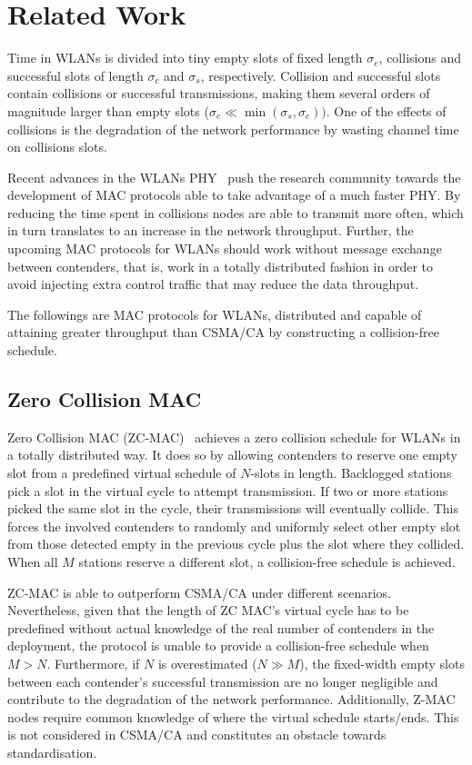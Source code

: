 \documentclass[a4paper,journal]{IEEEtran}
\begin{document}
\section{Related Work}\label{relatedWork}
Time in WLANs is divided into tiny empty slots of fixed length $\sigma_{e}$, collisions and successful slots of length $\sigma_{c}$ and $\sigma_{s}$, respectively. Collision and successful slots contain collisions or successful transmissions, making them several orders of magnitude larger than empty slots ($\sigma_{e}\ll\min(\sigma_{s},\sigma_{c}))$. One of the effects of collisions is the degradation of the network performance by wasting channel time on collisions slots. 

Recent advances in the WLANs PHY~\cite{perahia2008ieee,6191306} push the research community towards the development of MAC protocols able to take advantage of a much faster PHY. By reducing the time spent in collisions nodes are able to transmit more often, which in turn translates to an increase in the network throughput. Further, the upcoming MAC protocols for WLANs should work without message exchange between contenders, that is, work in a totally distributed fashion in order to avoid injecting extra control traffic that may reduce the data throughput.

The followings are MAC protocols for WLANs, distributed and capable of attaining greater throughput than CSMA/CA by constructing a collision-free schedule.

\subsection{Zero Collision MAC} 

Zero Collision MAC (ZC-MAC)~\cite{ZMAC} achieves a zero collision schedule for WLANs in a totally distributed way. It does so by allowing contenders to reserve one empty slot from a predefined virtual schedule of $N$-slots in length. Backlogged stations pick a slot in the virtual cycle to attempt transmission. If two or more stations picked the same slot in the cycle, their transmissions will eventually collide. This forces the involved contenders to randomly and uniformly select other empty slot from those detected empty in the previous cycle plus the slot where they collided. When all $M$ stations reserve a different slot, a collision-free schedule is achieved.

ZC-MAC is able to outperform CSMA/CA under different scenarios. Nevertheless, given that the length of ZC MAC's virtual cycle has to be predefined without actual knowledge of the real number of contenders in the deployment, the protocol is unable to provide a collision-free schedule when $M>N$. Furthermore, if $N$ is overestimated ($N\gg M$), the fixed-width empty slots between each contender's successful transmission are no longer negligible and contribute to the degradation of the network performance. Additionally, Z-MAC nodes require common knowledge of where the virtual schedule starts/ends. This is not considered in CSMA/CA and constitutes an obstacle towards standardisation.
\end{document}
